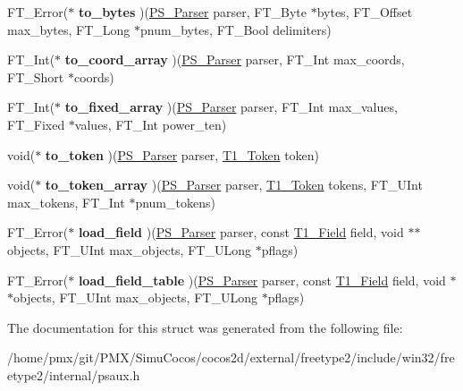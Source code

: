 \begin{DoxyCompactItemize}
\item 
\mbox{\label{structPS__Parser__FuncsRec___abbda6afe648361ec1efa535fc853ce54}} 
F\+T\+\_\+\+Error($\ast$ {\bfseries to\+\_\+bytes} )(\hyperlink{structPS__ParserRec__}{P\+S\+\_\+\+Parser} parser, F\+T\+\_\+\+Byte $\ast$bytes, F\+T\+\_\+\+Offset max\+\_\+bytes, F\+T\+\_\+\+Long $\ast$pnum\+\_\+bytes, F\+T\+\_\+\+Bool delimiters)
\item 
\mbox{\label{structPS__Parser__FuncsRec___a11da5ac33187bc7b67696a9d24f3d239}} 
F\+T\+\_\+\+Int($\ast$ {\bfseries to\+\_\+coord\+\_\+array} )(\hyperlink{structPS__ParserRec__}{P\+S\+\_\+\+Parser} parser, F\+T\+\_\+\+Int max\+\_\+coords, F\+T\+\_\+\+Short $\ast$coords)
\item 
\mbox{\label{structPS__Parser__FuncsRec___a5b9316c7a5459857da99f6158afdf3d9}} 
F\+T\+\_\+\+Int($\ast$ {\bfseries to\+\_\+fixed\+\_\+array} )(\hyperlink{structPS__ParserRec__}{P\+S\+\_\+\+Parser} parser, F\+T\+\_\+\+Int max\+\_\+values, F\+T\+\_\+\+Fixed $\ast$values, F\+T\+\_\+\+Int power\+\_\+ten)
\item 
\mbox{\label{structPS__Parser__FuncsRec___ad963b97fac4a1ae52f4a68e693f39907}} 
void($\ast$ {\bfseries to\+\_\+token} )(\hyperlink{structPS__ParserRec__}{P\+S\+\_\+\+Parser} parser, \hyperlink{structT1__TokenRec__}{T1\+\_\+\+Token} token)
\item 
\mbox{\label{structPS__Parser__FuncsRec___ac3cb6fd9c5eb16d8d853fa02e57602c2}} 
void($\ast$ {\bfseries to\+\_\+token\+\_\+array} )(\hyperlink{structPS__ParserRec__}{P\+S\+\_\+\+Parser} parser, \hyperlink{structT1__TokenRec__}{T1\+\_\+\+Token} tokens, F\+T\+\_\+\+U\+Int max\+\_\+tokens, F\+T\+\_\+\+Int $\ast$pnum\+\_\+tokens)
\item 
\mbox{\label{structPS__Parser__FuncsRec___a1e3a763197f876746bc053bee27a3b86}} 
F\+T\+\_\+\+Error($\ast$ {\bfseries load\+\_\+field} )(\hyperlink{structPS__ParserRec__}{P\+S\+\_\+\+Parser} parser, const \hyperlink{structT1__FieldRec__}{T1\+\_\+\+Field} field, void $\ast$$\ast$objects, F\+T\+\_\+\+U\+Int max\+\_\+objects, F\+T\+\_\+\+U\+Long $\ast$pflags)
\item 
\mbox{\label{structPS__Parser__FuncsRec___ac925f8b8b583c22717da0475a2427863}} 
F\+T\+\_\+\+Error($\ast$ {\bfseries load\+\_\+field\+\_\+table} )(\hyperlink{structPS__ParserRec__}{P\+S\+\_\+\+Parser} parser, const \hyperlink{structT1__FieldRec__}{T1\+\_\+\+Field} field, void $\ast$$\ast$objects, F\+T\+\_\+\+U\+Int max\+\_\+objects, F\+T\+\_\+\+U\+Long $\ast$pflags)
\end{DoxyCompactItemize}


The documentation for this struct was generated from the following file\+:\begin{DoxyCompactItemize}
\item 
/home/pmx/git/\+P\+M\+X/\+Simu\+Cocos/cocos2d/external/freetype2/include/win32/freetype2/internal/psaux.\+h\end{DoxyCompactItemize}
